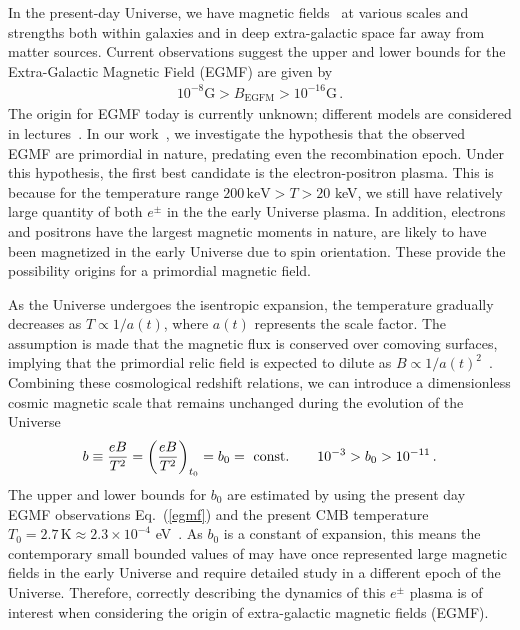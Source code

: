 In the present-day Universe, we have magnetic fields~\cite{Giovannini:2003yn,Kronberg:1993vk} at various scales and strengths both within galaxies and in deep extra-galactic space far away from matter sources. Current observations suggest the upper and lower bounds for the Extra-Galactic Magnetic Field (EGMF) are given by~\cite{neronov2010evidence,taylor2011extragalactic,pshirkov2015new,jedamzik2019stringent,vernstrom2021discovery}
\begin{align}
    \label{egmf}
    10^{-8}{\mathrm G}>B_{\mathrm{EGFM}}>10^{-16}{\mathrm G}\,.
\end{align}
The origin for EGMF today is currently unknown; different models are considered in lectures~\cite{Widrow:2011hs,Vazza:2021vwy}. In our work~\cite{Rafelski:2023emw}, we investigate the hypothesis that the observed EGMF are primordial in nature, predating even the recombination
epoch. Under this hypothesis, the first best candidate is the electron-positron plasma. This is because for the temperature range $ 200\,\mathrm{keV} > T > 20$ keV, we still have relatively large quantity of both $e^\pm$ in the the early Universe plasma. In addition, electrons and positrons have the largest magnetic moments in nature, are likely to have been magnetized in the early Universe due to spin orientation. These  provide the possibility origins for a primordial magnetic field.

As the Universe undergoes the isentropic expansion,  the temperature gradually decreases as $T\propto1/a(t)$, where $a(t)$ represents the scale factor. The assumption is made that the magnetic flux is conserved over comoving surfaces, implying that the primordial relic field is expected to dilute as $B\propto1/a(t)^{2}$~\cite{Rafelski:2023emw}. Combining these cosmological redshift relations, we can introduce a dimensionless cosmic magnetic scale that remains unchanged during the evolution of the Universe 
\begin{align}
    \label{tbscale}
    b \equiv\frac{e{B}}{T^{2}}=\left(\frac{e{B}}{T^{2}}\right)_{t_0}=b_0={\rm\ const.}\qquad10^{-3}>b_{0}>10^{-11}\,.
\end{align}
The upper and lower bounds for $b_0$ are estimated by using the present day EGMF observations Eq.~(\ref{egmf}) and the present CMB temperature $T_{0}=2.7\,\mathrm{K}\approx2.3\times10^{-4}$ eV~\cite{aghanim2018planck}.
As $b_0$ is a constant of expansion, this means the contemporary small bounded values of may have once represented large magnetic fields in the early Universe and require detailed study in a different epoch of the Universe. Therefore, correctly describing the dynamics of this $e^{\pm}$ plasma is of interest when considering the origin of extra-galactic magnetic fields (EGMF). 

